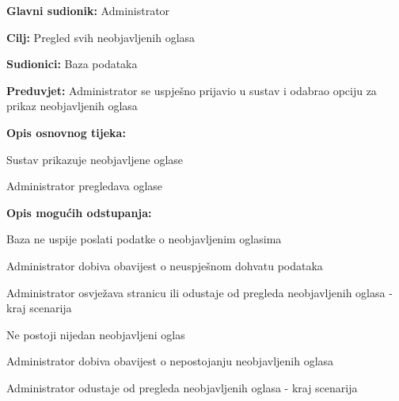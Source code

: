 					\noindent {}
					\begin{packed_item}
	
						\item \textbf{Glavni sudionik: }Administrator
						\item  \textbf{Cilj:} Pregled svih neobjavljenih oglasa
						\item  \textbf{Sudionici:} Baza podataka
						\item  \textbf{Preduvjet:} Administrator se uspješno prijavio u sustav i odabrao opciju za prikaz neobjavljenih oglasa
						\item  \textbf{Opis osnovnog tijeka:}
						
						\item[] \begin{packed_enum}
							\item Sustav prikazuje neobjavljene oglase
							\item Administrator pregledava oglase
						\end{packed_enum}
						\item  \textbf{Opis mogućih odstupanja:}

						\item[] \begin{packed_item}
							\item[1.a] Baza ne uspije poslati podatke o neobjavljenim oglasima
							\item[] \begin{packed_enum}
								
								\item Administrator dobiva obavijest o neuspješnom dohvatu podataka
								\item Administrator osvježava stranicu ili odustaje od pregleda neobjavljenih oglasa - kraj scenarija
							
							\end{packed_enum}	
							\item[1.b] Ne postoji nijedan neobjavljeni oglas
							\item[] \begin{packed_enum}
								
								\item Administrator dobiva obavijest o nepostojanju neobjavljenih oglasa
								\item Administrator odustaje od pregleda neobjavljenih oglasa - kraj scenarija
							
							\end{packed_enum}
						\end{packed_item}	
					\end{packed_item}
					
